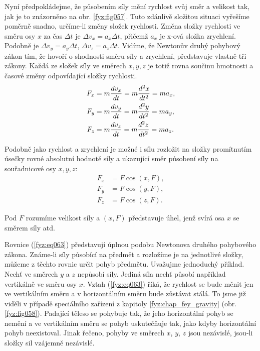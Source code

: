    Nyní předpokládejme, že působením síly mění rychlost svůj směr a velikost tak, jak je to 
    znázorněno na obr. \ref{fyz:fig057}. Tuto zdánlivě složitou situaci vyřešíme poměrně snadno, 
    určíme-li změny složek rychlosti. Změna složky rychlosti ve směru osy \(x\) za čas \(\Delta t\) 
    je \(\Delta v_x = a_x\Delta t\), přičemž \(a_x\) je x-ová složka zrychlení. Podobně je \(\Delta 
    v_y = a_y\Delta t\), \(\Delta v_z = a_z\Delta t\). Vidíme, že Newtonův druhý pohybový 
    zákon tím, že hovoří o shodnosti směru síly a zrychlení, představuje vlastně tři zákony. Každá 
    ze složek síly ve směrech \(x, y, z\) je totiž rovna součinu hmotnosti a časové změny 
    odpovídající složky rychlosti.
    \begin{subequations}\label{fyz:eq063}
      \begin{align}
        F_x &= m\dfrac{d v_x}{d t} = m\dfrac{d^2 x}{d t^2} = ma_x, \\
        F_y &= m\dfrac{d v_y}{d t} = m\dfrac{d^2 y}{d t^2} = ma_y, \\
        F_z &= m\dfrac{d v_z}{d t} = m\dfrac{d^2 z}{d t^2} = ma_z. 
      \end{align}
    \end{subequations}
    
    Podobně jako rychlost a zrychlení je možné i sílu rozložit na složky promítnutím úsečky rovné 
    absolutní hodnotě síly a ukazující směr působení síly na souřadnicové osy \(x, y, z\):
    \begin{subequations}\label{fyz:eq064}
      \begin{align}
        F_x &= F\cos(x,F),\\
        F_y &= F\cos(y,F),\\
        F_z &= F\cos(z,F).
      \end{align}
    \end{subequations}

    Pod \(F\) rozumíme velikost síly a \((x, F)\) představuje úhel, jenž svírá osa \(x\) se směrem 
    síly atd.
    
    Rovnice (\ref{fyz:eq063}) představují úplnou podobu Newtonova druhého pohybového zákona. 
    Známe-li síly působící na předmět a rozložíme je na jednotlivé složky, můžeme z těchto rovnic 
    určit pohyb předmětu. Uvažujme jednoduchý příklad. Nechť ve směrech \(y\) a \(z\) nepůsobí 
    síly. Jediná síla nechť působí například vertikálně ve směru osy \(x\). Vztah (\ref{fyz:eq063}) 
    říká, že rychlost se bude měnit jen ve vertikálním směru a v horizontálním směru bude zůstávat 
    stálá. To jsme již viděli v případě speciálního zařízení z kapitoly \ref{fyz:chap_fey_gravity} 
    (obr. \ref{fyz:fig058}). Padající těleso se pohybuje tak, že jeho horizontální pohyb se nemění 
    a ve vertikálním směru se pohyb uskutečňuje tak, jako kdyby horizontální pohyb neexistoval. 
    Jinak řečeno, pohyby ve směrech \(x\), \(y\), \(z\) jsou nezávislé, jsou-li složky sil vzájemně 
    nezávislé.
    
